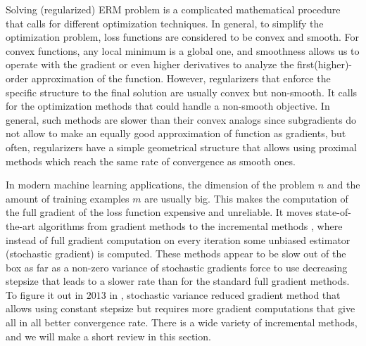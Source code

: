 Solving (regularized) ERM problem is a complicated mathematical procedure that calls for different optimization techniques. In general, to simplify the optimization problem, loss functions are considered to be convex and smooth. For convex functions, any local minimum is a global one, and smoothness allows us to operate with the gradient or even higher derivatives to analyze the first(higher)-order approximation of the function. However, regularizers that enforce the specific structure to the final solution are usually convex but non-smooth. It calls for the optimization methods that could handle a non-smooth objective. In general, such methods are slower than their convex analogs since subgradients do not allow to make an equally good approximation of function as gradients, but often, regularizers have a simple geometrical structure that allows using proximal methods which reach the same rate of convergence as smooth ones.

In modern machine learning applications, the dimension of the problem $n$ and the amount of training examples $m$ are usually big. This makes the computation of the full gradient of the loss function expensive and unreliable. It moves state-of-the-art algorithms from gradient methods \cite{nesterov-book} to the incremental methods \cite{bertsekas2011incremental, bottou2010large}, where instead of full gradient computation on every iteration some unbiased estimator (stochastic gradient) is computed. These methods appear to be slow out of the box as far as a non-zero variance of stochastic gradients force to use decreasing stepsize that leads to a slower rate than for the standard full gradient methods. To figure it out in $2013$ in \cite{johnson2013accelerating}, stochastic variance reduced gradient method that allows using constant stepsize but requires more gradient computations that give all in all better convergence rate. {There is a wide variety of incremental methods, and we will make a short review in this section.}

